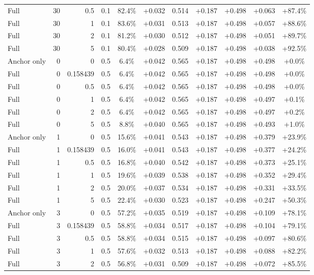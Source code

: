 \begin{table}[htbp]
\begin{tabular}{lrrrccccccc}
Full & 30 & 0.5 & 0.1 & 82.4\% & +0.032 & 0.514 & +0.187 & +0.498 & +0.063 & +87.4\% \\
Full & 30 & 1 & 0.1 & 83.6\% & +0.031 & 0.513 & +0.187 & +0.498 & +0.057 & +88.6\% \\
Full & 30 & 2 & 0.1 & 81.2\% & +0.030 & 0.512 & +0.187 & +0.498 & +0.051 & +89.7\% \\
Full & 30 & 5 & 0.1 & 80.4\% & +0.028 & 0.509 & +0.187 & +0.498 & +0.038 & +92.5\% \\
Anchor only & 0 & 0 & 0.5 & 6.4\% & +0.042 & 0.565 & +0.187 & +0.498 & +0.498 & +0.0\% \\
Full & 0 & 0.158439 & 0.5 & 6.4\% & +0.042 & 0.565 & +0.187 & +0.498 & +0.498 & +0.0\% \\
Full & 0 & 0.5 & 0.5 & 6.4\% & +0.042 & 0.565 & +0.187 & +0.498 & +0.498 & +0.0\% \\
Full & 0 & 1 & 0.5 & 6.4\% & +0.042 & 0.565 & +0.187 & +0.498 & +0.497 & +0.1\% \\
Full & 0 & 2 & 0.5 & 6.4\% & +0.042 & 0.565 & +0.187 & +0.498 & +0.497 & +0.2\% \\
Full & 0 & 5 & 0.5 & 8.8\% & +0.040 & 0.565 & +0.187 & +0.498 & +0.493 & +1.0\% \\
Anchor only & 1 & 0 & 0.5 & 15.6\% & +0.041 & 0.543 & +0.187 & +0.498 & +0.379 & +23.9\% \\
Full & 1 & 0.158439 & 0.5 & 16.0\% & +0.041 & 0.543 & +0.187 & +0.498 & +0.377 & +24.2\% \\
Full & 1 & 0.5 & 0.5 & 16.8\% & +0.040 & 0.542 & +0.187 & +0.498 & +0.373 & +25.1\% \\
Full & 1 & 1 & 0.5 & 19.6\% & +0.039 & 0.538 & +0.187 & +0.498 & +0.352 & +29.4\% \\
Full & 1 & 2 & 0.5 & 20.0\% & +0.037 & 0.534 & +0.187 & +0.498 & +0.331 & +33.5\% \\
Full & 1 & 5 & 0.5 & 22.4\% & +0.030 & 0.523 & +0.187 & +0.498 & +0.247 & +50.3\% \\
Anchor only & 3 & 0 & 0.5 & 57.2\% & +0.035 & 0.519 & +0.187 & +0.498 & +0.109 & +78.1\% \\
Full & 3 & 0.158439 & 0.5 & 58.8\% & +0.034 & 0.517 & +0.187 & +0.498 & +0.104 & +79.1\% \\
Full & 3 & 0.5 & 0.5 & 58.8\% & +0.034 & 0.515 & +0.187 & +0.498 & +0.097 & +80.6\% \\
Full & 3 & 1 & 0.5 & 57.6\% & +0.032 & 0.513 & +0.187 & +0.498 & +0.088 & +82.2\% \\
Full & 3 & 2 & 0.5 & 56.8\% & +0.031 & 0.509 & +0.187 & +0.498 & +0.072 & +85.5\% \\

\end{tabular}
\end{table}
